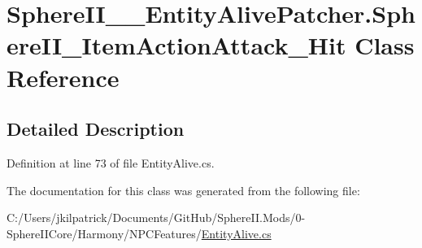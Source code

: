 \hypertarget{class_sphere_i_i_____entity_alive_patcher_1_1_sphere_i_i___item_action_attack___hit}{}\section{Sphere\+I\+I\+\_\+\+\_\+\+Entity\+Alive\+Patcher.\+Sphere\+I\+I\+\_\+\+Item\+Action\+Attack\+\_\+\+Hit Class Reference}
\label{class_sphere_i_i_____entity_alive_patcher_1_1_sphere_i_i___item_action_attack___hit}


\subsection{Detailed Description}


Definition at line 73 of file Entity\+Alive.\+cs.



The documentation for this class was generated from the following file\+:\begin{DoxyCompactItemize}
\item 
C\+:/\+Users/jkilpatrick/\+Documents/\+Git\+Hub/\+Sphere\+I\+I.\+Mods/0-\/\+Sphere\+I\+I\+Core/\+Harmony/\+N\+P\+C\+Features/\mbox{\hyperlink{_entity_alive_8cs}{Entity\+Alive.\+cs}}\end{DoxyCompactItemize}
